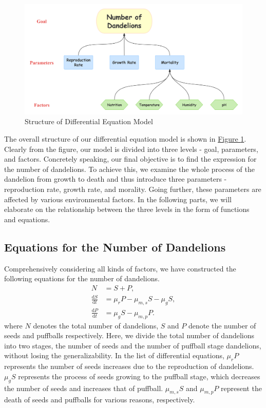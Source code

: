 \documentclass[12pt]{article}
\begin{document}
\begin{figure}[h]
    \centering
    \includegraphics[width=0.6\linewidth]{img/flowchart.png}
    \caption{Structure of Differential Equation Model}
    \label{Structure}
\end{figure}
The overall structure of our differential equation model is shown in \hyperref[Structure]{Figure \ref*{Structure}}. Clearly from the figure, our model is divided into three levels - goal, parameters, and factors. Concretely speaking, our final objective is to find the expression for the number of dandelions. To achieve this, we examine the whole process of the dandelion from growth to death and thus introduce three parameters - reproduction rate, growth rate, and morality. Going further, these parameters are affected by various environmental factors. In the following parts, we will elaborate on the relationship between the three levels in the form of functions and equations.

\subsection{Equations for the Number of Dandelions}
Comprehensively considering all kinds of factors, we have constructed the following equations for the number of dandelions.
\begin{equation}
    \begin{aligned}
    N&=S+P,\\[0.5em]
    \frac{\mathrm{d}S}{\mathrm{d}t}&=\mu_rP-\mu_{m,s}S-\mu_gS,\\[0.5em]
    \frac{\mathrm{d}P}{\mathrm{d}t}&=\mu_gS-\mu_{m,p}P.
    \end{aligned}
\end{equation}
where $N$ denotes the total number of dandelions, $S$ and $P$ denote the number of seeds and puffballs respectively. Here, we divide the total number of dandelions into two stages, the number of seeds and the number of puffball stage dandelions, without losing the generalizability. In the list of differential equations, \(\mu_r P\) represents the number of seeds increases due to the reproduction of dandelions. \(\mu_gS\) represents the process of seeds growing to the puffball stage, which decreases the number of seeds and increases that of puffball. \(\mu_{m,s} S\) and \(\mu_{m,p} P\) represent the death of seeds and puffballs for various reasons, respectively.
\end{document}
